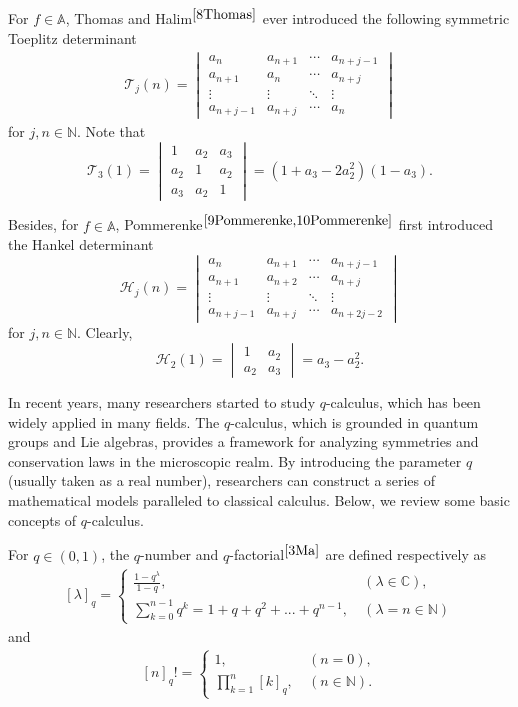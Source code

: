 \documentclass[11pt,twoside, reqno]{article}
\theoremstyle{definition}
\begin{document}
For $f\in \mathbb{A} $, Thomas and Halim$^{\cite{8Thomas}}$ ever introduced the following symmetric Toeplitz determinant
$$\begin{gathered}\mathcal{T}_j(n)=\begin{vmatrix}a_n&a_{n+1}&\cdots&a_{n+j-1}\\a_{n+1}&a_n&\cdots&a_{n+j}
\\\vdots&\vdots&\ddots&\vdots\\a_{n+j-1}&a_{n+j}&\cdots&a_n\end{vmatrix}\end{gathered}$$
for $j,n\in\mathbb{N}$. Note that 
$$\mathcal{T}_3(1)=\begin{vmatrix}1&a_2&a_3\\a_2&1&a_2\\a_3&a_2&1\end{vmatrix}=(1+a_3-2a_2^2)(1-a_3).$$

Besides, for $f\in \mathbb{A} $, Pommerenke$^{\cite{9Pommerenke,10Pommerenke}}$ first introduced the Hankel determinant
$$\mathcal{H}_j(n)=\begin{vmatrix}a_n&a_{n+1}&\cdots&a_{n+j-1}\\a_{n+1}&a_{n+2}&\cdots&a_{n+j}
\\\vdots&\vdots&\ddots&\vdots
\\a_{n+j-1}&a_{n+j}&\cdots&a_{n+2j-2}\end{vmatrix}$$
for $j, n\in\mathbb{N}$. Clearly,
$$\mathcal{H}_2(1)=\begin{vmatrix}1&a_2\\a_2&a_3\end{vmatrix}=a_3-a_2^2.$$

In recent years, many researchers started to study $q$-calculus, which has been widely applied in many fields. The $q$-calculus, which is grounded in quantum groups and Lie algebras, provides a framework for analyzing symmetries and conservation laws in the microscopic realm. By introducing the parameter $q$ (usually taken as a real number), researchers can construct a series of mathematical models paralleled to classical calculus. Below, we review some basic concepts of $q$-calculus.

For $q\in (0,1)$, the $q$-number and $q$-factorial$^{\cite{3Ma}}$ are defined respectively as
\begin{align}\nonumber
[\lambda]_q=\begin{cases}\frac{1-q^\lambda}{1-q},\ &(\lambda\in\mathbb{C}),
\\\sum_{k=0}^{n-1}q^k=1+q+q^2+...+q^{n-1},\ &(\lambda=n\in\mathbb{N})\end{cases}
\end{align}
and
\begin{align}\nonumber
[n]_q!=\begin{cases}1,\ &(n=0),
\\\prod^{n}_{k=1}[k]_{q},\ &(n\in\mathbb{N}). \end{cases}
\end{align}
\end{document}
